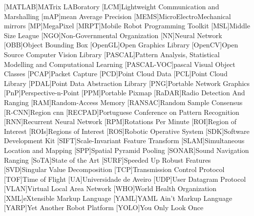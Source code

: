 \begin{multicols}{2}
\begin{acronym}[AAAAAA]
	[MATLAB\textsuperscript{\tiny\textregistered}]{MATrix LABoratory\textsuperscript{\tiny\textregistered}}
	[LCM]{Lightweight Communication and Marshalling}
	[mAP]{mean Average Precision}
	[MEMS]{MicroElectroMechanical mirrors}
	[MP]{MegaPixel}
	[MRPT]{Mobile Robot Programming Toolkit}
	[MSL]{Middle Size League}
	[NGO]{Non-Governmental Organization} 
	[NN]{Neural Network}
	[OBB]{Object Bounding Box}
	[OpenGL]{Open Graphics Library}
	[OpenCV]{Open Source Computer Vision Library}
	[PASCAL]{Pattern Analysis, Statistical Modelling and Computational Learning} 
	[PASCAL-VOC]{\acl{pascal} Visual Object Classes}
	[PCAP]{Packet Capture}
	[PCD]{Point Cloud Data}
	[PCL]{Point Cloud Library}
	[PDAL]{Point Data Abstraction Library}
	[PNG]{Portable Network Graphics}
	[PnP]{Perspective-n-Point}
	[PPM]{Portable Pixmap}
	[RaDAR]{Radio Detection And Ranging}
	[RAM]{Random-Access Memory}
	[RANSAC]{Random Sample Consensus}
	[R-CNN]{Region \acl{cnn}}
	[RECPAD]{Portuguese Conference on Pattern Recognition}
	[RNN]{Recurrent Neural Network}
	[RPM]{Rotations Per Minute}
	[ROI]{Region of Interest}
	[ROIs]{Regions of Interest}
	[ROS]{Robotic Operative System}
	[SDK]{Software Development Kit}
	[SIFT]{Scale-Invariant Feature Transform}
	[SLAM]{Simultaneous Location and Mapping} 
	[SPP]{Spatial Pyramid Pooling}
	[SONAR]{Sound Navigation Ranging}
	[SoTA]{State of the Art}
	[SURF]{Speeded Up Robust Features}
	[SVD]{Singular Value Decomposition}
	[TCP]{Transmission Control Protocol}
	[TOF]{Time of Flight} 
	[UA]{Universidade de Aveiro}
	[UDP]{User Datagram Protocol}
	[VLAN]{Virtual Local Area Network}
	[WHO]{World Health Organization}
	[XML]{eXtensible Markup Language}
	[YAML]{YAML Ain't Markup Language}
	[YARP]{Yet Another Robot Platform}
	[YOLO]{You Only Look Once}
\end{acronym}
\end{multicols}

